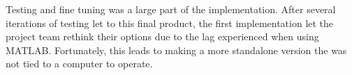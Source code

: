Testing and fine tuning was a large part of the implementation. After several iterations of testing let to this final product, the first implementation let the project team rethink their options due to the lag experienced when using MATLAB. Fortunately, this leads to making a more standalone version the was not tied to a computer to operate.





